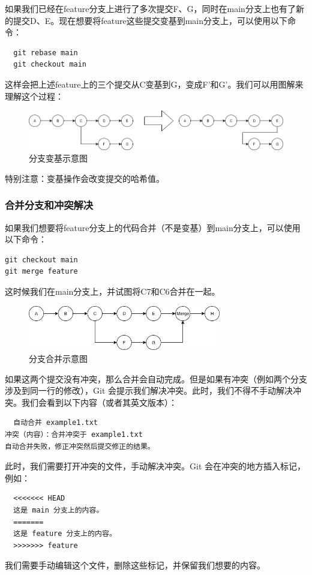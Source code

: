 \documentclass[../main.tex]{subfiles}
\begin{document}
如果我们已经在feature分支上进行了多次提交F、G，同时在main分支上也有了新的提交D、E。现在想要将feature这些提交变基到main分支上，可以使用以下命令：
\begin{verbatim}
  git rebase main
  git checkout main
\end{verbatim}
这样会把上述feature上的三个提交从C变基到G，变成F'和G'。我们可以用图解来理解这个过程：

\begin{figure}[htbp]
\centering
\includegraphics[width=\textwidth]{images/git-rebase.png}
\caption{分支变基示意图}
\label{fig:git-rebase}
\end{figure}

特别注意：变基操作会改变提交的哈希值。

\subsubsection{合并分支和冲突解决}

如果我们想要将feature分支上的代码合并（不是变基）到main分支上，可以使用以下命令：

\begin{verbatim}
git checkout main
git merge feature
\end{verbatim}

这时候我们在main分支上，并试图将C7和C6合并在一起。

\begin{figure}[htbp]
\centering
\includegraphics[width=0.75\textwidth]{images/git-merge.png}
\caption{分支合并示意图}
\label{fig:git-merge}
\end{figure}

如果这两个提交没有冲突，那么合并会自动完成。但是如果有冲突（例如两个分支涉及到同一行的修改），Git 会提示我们解决冲突。此时，我们不得不手动解决冲突。我们会看到以下内容（或者其英文版本）：
\begin{verbatim}
  自动合并 example1.txt
冲突（内容）：合并冲突于 example1.txt
自动合并失败，修正冲突然后提交修正的结果。
\end{verbatim}
此时，我们需要打开冲突的文件，手动解决冲突。Git 会在冲突的地方插入标记，例如：
\begin{verbatim}
  <<<<<<< HEAD
  这是 main 分支上的内容。
  =======
  这是 feature 分支上的内容。
  >>>>>>> feature
\end{verbatim}
我们需要手动编辑这个文件，删除这些标记，并保留我们想要的内容。
\end{document}
